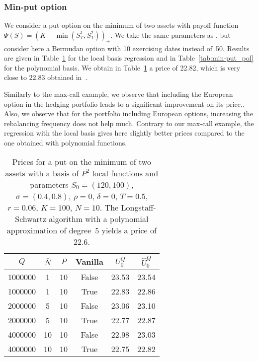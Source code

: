 \subsubsection{Min-put option}

We consider a put option on the minimum of two assets with payoff function $\Psi(S)=(K - \min(S^1_T, S^2_T))_+$. We take the same parameters as \cite[Table 4.5]{rogers-02}, but consider here a Bermudan option with 10 exercising dates instead of~50. Results are given in Table~\ref{tab:min-put_loc} for the local basis regression and in Table~\ref{tab:min-put_pol} for the polynomial basis. We obtain in Table~\ref{tab:min-put_loc} a price of 22.82, which is very close to 22.83 obtained in~\cite[Table 4.5]{rogers-02}.

Similarly to the max-call example, we observe that including the European option in the hedging portfolio leads to a significant improvement on its price.. Also, we observe that for the portfolio including European options, increasing the rebalancing frequency does not help much.
Contrary to our max-call example, the regression with the local basis gives here slightly better prices compared to the one obtained with polynomial functions.

\begin{table}[htbp!]
  \centering\begin{tabular}{cccccc}
    \hline
    $Q$ & $\bar{N}$ & $P$ & Vanilla\phantom{$\Big|$} & $U_0^Q$ & $\hat{U}_0^Q$ \\
    \hline
    1000000 & 1 & 10 & False & 23.53 & 23.54 \\
    1000000 & 1 & 10 & True & 22.83 & 22.86 \\
    2000000 & 5 & 10 & False & 23.06 & 23.10 \\
    2000000 & 5 & 10 & True & 22.77 & 22.87 \\
    4000000 & 10 & 10 & False & 22.98 & 23.03 \\
    4000000 & 10 & 10 & True & 22.75 & 22.82 \\
    \hline
  \end{tabular}
  \caption{Prices for a put on the minimum of two assets with a basis of $P^2$ local functions and parameters $S_0=(120,100)$, $\sigma=(0.4,0.8)$,  $\rho=0$, $\delta=0$, $T=0.5$, $r=0.06$, $K=100$, $N=10$. The Longstaff-Schwartz algorithm with a polynomial approximation of degree~$5$ yields a price of $22.6$.}\label{tab:min-put_loc}
\end{table}


